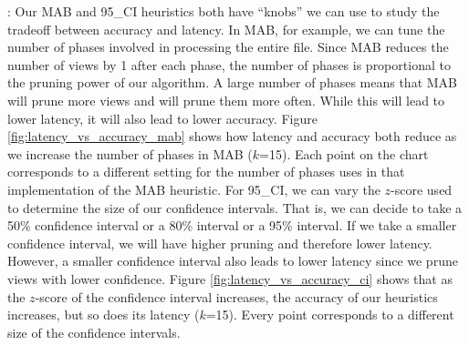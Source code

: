 :
Our MAB and 95\_CI heuristics both have ``knobs'' we can use to study the
tradeoff between accuracy and latency.
In MAB, for example, we can tune the number of phases involved in
processing the entire file. 
Since MAB reduces the number of views by 1 after each phase, the number of
phases is proportional to the pruning power of our algorithm.
A large number of phases means that MAB will prune more views and will prune
them more often.
While this will lead to lower latency, it will also lead to lower accuracy.
Figure \ref{fig:latency_vs_accuracy_mab} shows how latency and accuracy both
reduce as we increase the number of phases in MAB ($k$=15).
Each point on the chart corresponds to a different setting for the number of
phases uses in that implementation of the MAB heuristic.
For 95\_CI, we can vary the $z$-score used
to determine the size of our confidence intervals.
That is, we can decide to take a 50\% confidence interval or a 80\% interval or
a 95\% interval.
If we take a smaller confidence interval, we will have higher pruning and
therefore lower latency.
However, a smaller confidence interval also leads to lower latency since we
prune views with lower confidence.
Figure \ref{fig:latency_vs_accuracy_ci} shows that as the $z$-score of the
confidence interval increases, the accuracy of our heuristics increases, but so
does its latency ($k$=15).
Every point corresponds to a different size of the confidence intervals.

